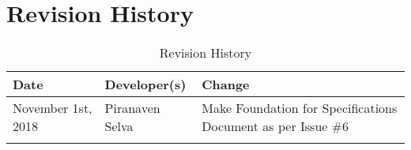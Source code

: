 \documentclass{article}
\begin{document}
\newpage
\section{Revision History}
\begin{table}[hp]
\caption{Revision History} \label{TblRevisionHistory}
\begin{tabularx}{\textwidth}{llX}
\toprule
\textbf{Date} & \textbf{Developer(s)} & \textbf{Change}\\
\midrule
November 1st, 2018 &Piranaven Selva & Make Foundation for Specifications Document as per Issue \#6 \\
\\
\bottomrule
\end{tabularx}
\end{table}
\end{document}
